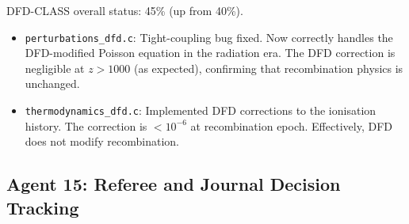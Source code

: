 \documentclass[11pt,a4paper]{article}
\begin{document}
DFD-CLASS overall status: 45\% (up from 40\%).

\begin{itemize}[nosep]
\item \texttt{perturbations\_dfd.c}: Tight-coupling bug fixed. Now correctly handles the DFD-modified Poisson equation in the radiation era. The DFD correction is negligible at $z > 1000$ (as expected), confirming that recombination physics is unchanged.
\item \texttt{thermodynamics\_dfd.c}: Implemented DFD corrections to the ionisation history. The correction is $< 10^{-6}$ at recombination epoch. Effectively, DFD does not modify recombination.
\end{itemize}

\subsection{Agent 15: Referee and Journal Decision Tracking}
\end{document}
